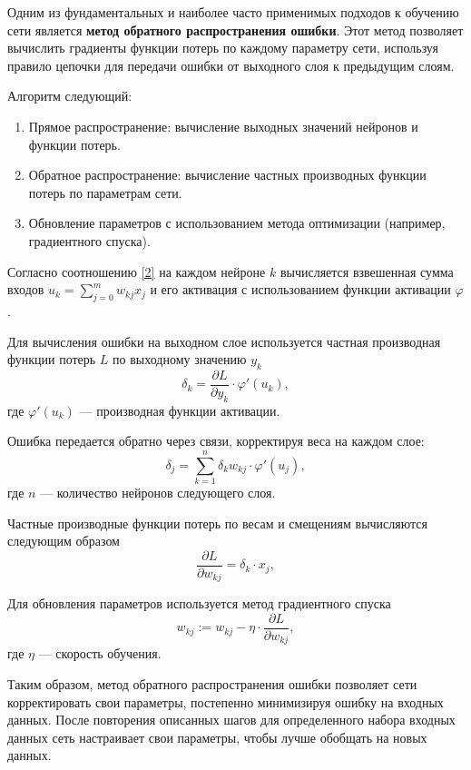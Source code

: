 \documentclass[12pt, a4paper]{article}
\renewcommand{\phi}{\varphi}
\begin{document}
Одним из фундаментальных и наиболее часто применимых подходов к обучению сети является \textbf{метод обратного распространения ошибки}. Этот метод позволяет вычислить градиенты функции потерь по каждому параметру сети, используя правило цепочки для передачи ошибки от выходного слоя к предыдущим слоям.

Алгоритм следующий:
\begin{enumerate}
	\item Прямое распространение: вычисление выходных значений нейронов и функции потерь.
	\item Обратное распространение: вычисление частных производных функции потерь по параметрам сети.
	\item Обновление параметров с использованием метода оптимизации (например, градиентного спуска).
\end{enumerate}

Согласно соотношению \eqref{2} на каждом нейроне $k$ вычисляется взвешенная сумма входов $u_k = \sum_{j=0}^{m} w_{kj} x_j$ и его активация с использованием функции активации $\phi$.

Для вычисления ошибки на выходном слое используется частная производная функции потерь $L$ по выходному значению $y_k$
\begin{equation}
	\delta_k = \frac{\partial L}{\partial y_k} \cdot \phi'(u_k),
	\label{7}
\end{equation}
где $\phi'(u_k)$ — производная функции активации.

Ошибка передается обратно через связи, корректируя веса на каждом слое:
\begin{equation}
	\delta_j = \sum_{k=1}^{n} \delta_k w_{kj} \cdot \phi'(u_j),
	\label{8}
\end{equation}
где $n$ — количество нейронов следующего слоя.

Частные производные функции потерь по весам и смещениям вычисляются следующим образом
\begin{equation}
	\frac{\partial L}{\partial w_{kj}} = \delta_k \cdot x_j,
\end{equation}

Для обновления параметров используется метод градиентного спуска\cite[c.23]{10}
\begin{equation}
	w_{kj} := w_{kj} - \eta \cdot \frac{\partial L}{\partial w_{kj}},
	\label{11}
\end{equation}
где $\eta$ — скорость обучения.

Таким образом, метод обратного распространения ошибки позволяет сети корректировать свои параметры, постепенно минимизируя ошибку на входных данных. После повторения описанных шагов для определенного набора входных данных сеть настраивает свои параметры, чтобы лучше обобщать на новых данных.
\end{document}
